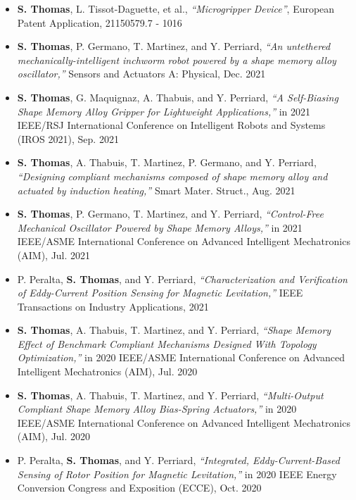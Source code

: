 \begin{itemize}
    \setlength\itemsep{0em}
\item[] \textbf{S. Thomas}, L. Tissot-Daguette, et al., \textit{“Microgripper Device”}, European Patent Application, 21150579.7 - 1016\\
\item[] \textbf{S. Thomas}, P. Germano, T. Martinez, and Y. Perriard, \textit{“An untethered mechanically-intelligent inchworm robot powered by a shape memory alloy oscillator,”} Sensors and Actuators A: Physical, Dec. 2021\\
\newpage
\item[] \textbf{S. Thomas}, G. Maquignaz, A. Thabuis, and Y. Perriard, \textit{“A Self-Biasing Shape Memory Alloy Gripper for Lightweight Applications,”} in 2021 IEEE/RSJ International Conference on Intelligent Robots and Systems (IROS 2021), Sep. 2021\\
\item[] \textbf{S. Thomas}, A. Thabuis, T. Martinez, P. Germano, and Y. Perriard, \textit{“Designing compliant mechanisms composed of shape memory alloy and actuated by induction heating,”} Smart Mater. Struct., Aug. 2021\\
\item[] \textbf{S. Thomas}, P. Germano, T. Martinez, and Y. Perriard, \textit{“Control-Free Mechanical Oscillator Powered by Shape Memory Alloys,”} in 2021 IEEE/ASME International Conference on Advanced Intelligent Mechatronics (AIM), Jul. 2021\\
\item[] P. Peralta, \textbf{S. Thomas}, and Y. Perriard, \textit{“Characterization and Verification of Eddy-Current Position Sensing for Magnetic Levitation,”} IEEE Transactions on Industry Applications, 2021\\
\item[] \textbf{S. Thomas}, A. Thabuis, T. Martinez, and Y. Perriard, \textit{“Shape Memory Effect of Benchmark Compliant Mechanisms Designed With Topology Optimization,”} in 2020 IEEE/ASME International Conference on Advanced Intelligent Mechatronics (AIM), Jul. 2020\\
\item[] \textbf{S. Thomas}, A. Thabuis, T. Martinez, and Y. Perriard, \textit{“Multi-Output Compliant Shape Memory Alloy Bias-Spring Actuators,”} in 2020 IEEE/ASME International Conference on Advanced Intelligent Mechatronics (AIM), Jul. 2020\\
\item[] P. Peralta, \textbf{S. Thomas}, and Y. Perriard, \textit{“Integrated, Eddy-Current-Based Sensing of Rotor Position for Magnetic Levitation,”} in 2020 IEEE Energy Conversion Congress and Exposition (ECCE), Oct. 2020\\

\end{itemize}
